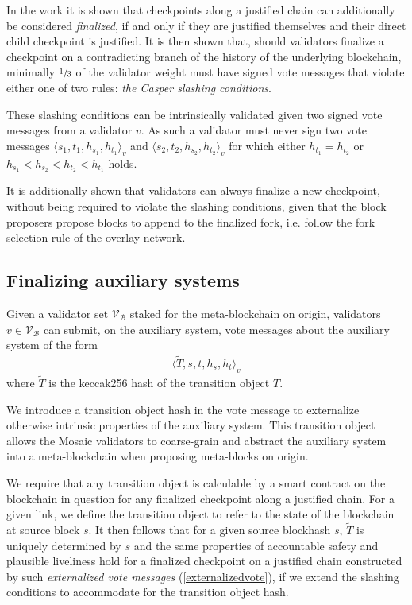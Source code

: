 \documentclass[12pt,a4paper]{article}
\begin{document}
In the work it is shown that checkpoints along a justified chain can additionally be considered \emph{finalized}, if and only if they are justified themselves and their direct child checkpoint is justified.
It is then shown that, should validators finalize a checkpoint on a contradicting branch of the history of the underlying blockchain, minimally $\sfrac{1}{3}$ of the validator weight must have signed vote messages that violate either one of two rules: \emph{the Casper slashing conditions}.

These slashing conditions can be intrinsically validated given two signed vote messages from a validator $v$.
As such a validator must never sign two vote messages $\langle s_1, t_1, h_{s_1}, h_{t_1}\rangle_v$ and $\langle s_2, t_2, h_{s_2}, h_{t_2}\rangle_v$ for which either $h_{t_1} = h_{t_2}$ or $h_{s_1} < h_{s_2} < h_{t_2} < h_{t_1}$ holds.

It is additionally shown that validators can always finalize a new checkpoint, without being required to violate the slashing conditions, given that the block proposers propose blocks to append to the finalized fork, i.e. follow the fork selection rule of the overlay network.

\subsection{Finalizing auxiliary systems}
Given a validator set $\mathcal{V}_\mathcal{B}$ staked for the meta-blockchain on origin, validators $v \in \mathcal{V}_\mathcal{B}$ can submit, on the auxiliary system, vote messages about the auxiliary system of the form
\begin{align}\label{externalizedvote}
  \langle \tilde{T}, s, t, h_s, h_t \rangle_v
\end{align}
where $\tilde{T}$ is the keccak256 hash of the transition object $T$.

We introduce a transition object hash in the vote message to externalize otherwise intrinsic properties of the auxiliary system.
This transition object allows the Mosaic validators to coarse-grain and abstract the auxiliary system into a meta-blockchain when proposing meta-blocks on origin.

We require that any transition object is calculable by a smart contract on the blockchain in question for any finalized checkpoint along a justified chain.
For a given link, we define the transition object to refer to the state of the blockchain at source block $s$. %
It then follows that for a given source blockhash $s$, $\tilde{T}$ is uniquely determined by $s$ and the same properties of accountable safety and plausible liveliness hold for a finalized checkpoint on a justified chain constructed by such \emph{externalized vote messages} (\ref{externalizedvote}), if we extend the slashing conditions to accommodate for the transition object hash.
\end{document}
